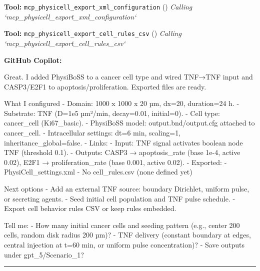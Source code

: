 \documentclass[11pt,a4paper]{article}
\begin{document}
\begin{toolokbox}
\textbf{Tool:} \texttt{mcp\_physicell\_export\_xml\_configuration} (\checkmark)
\textit{Calling `mcp\_physicell\_export\_xml\_configuration`}
\end{toolokbox}
\begin{toolokbox}
\textbf{Tool:} \texttt{mcp\_physicell\_export\_cell\_rules\_csv} (\checkmark)
\textit{Calling `mcp\_physicell\_export\_cell\_rules\_csv`}
\end{toolokbox}
\begin{copilotbox}
\textbf{GitHub Copilot:}

Great. I added PhysiBoSS to a cancer cell type and wired TNF→TNF input and CASP3/E2F1 to apoptosis/proliferation. Exported files are ready.

What I configured
- Domain: 1000 x 1000 x 20 µm, dx=20, duration=24 h.
- Substrate: TNF (D=1e5 µm²/min, decay=0.01, initial=0).
- Cell type: cancer\_cell (Ki67\_basic).
- PhysiBoSS model: output.bnd/output.cfg attached to cancer\_cell.
- Intracellular settings: dt=6 min, scaling=1, inheritance\_global=false.
- Links:
  - Input: TNF signal activates boolean node TNF (threshold 0.1).
  - Outputs: CASP3 → apoptosis\_rate (base 1e-4, active 0.02), E2F1 → proliferation\_rate (base 0.001, active 0.02).
- Exported:
  - PhysiCell\_settings.xml
  - No cell\_rules.csv (none defined yet)

Next options
- Add an external TNF source: boundary Dirichlet, uniform pulse, or secreting agents.
- Seed initial cell population and TNF pulse schedule.
- Export cell behavior rules CSV or keep rules embedded.

Tell me:
- How many initial cancer cells and seeding pattern (e.g., center 200 cells, random disk radius 200 µm)?
- TNF delivery (constant boundary at edges, central injection at t=60 min, or uniform pulse concentration)?
- Save outputs under gpt\_5/Scenario\_1?

\end{copilotbox}
\bigskip\hrule\bigskip
\end{document}
